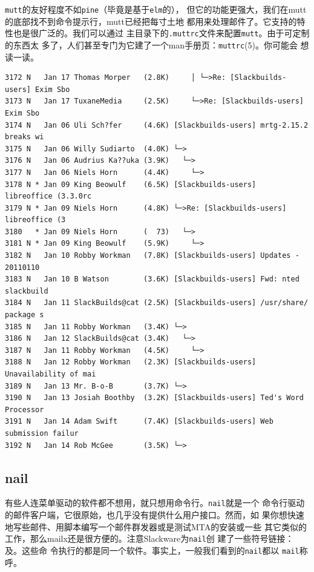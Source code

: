 \texttt{mutt}的友好程度不如\texttt{pine}（毕竟是基于\texttt{elm}的），
但它的功能更强大，我们在mutt的底部找不到命令提示行，mutt已经把每寸土地
都用来处理邮件了。它支持的特性也是很广泛的。我们可以通过
主目录下的\texttt{.muttrc}文件来配置\texttt{mutt}。由于可定制的东西太
多了，人们甚至专门为它建了一个man手册页：\texttt{muttrc}(5)。你可能会
想读一读。
\begin{Verbatim}[frame=single, commandchars=\\\{\}]
3172 N   Jan 17 Thomas Morper   (2.8K)     │ └─>Re: [Slackbuilds-users] Exim Sbo
3173 N   Jan 17 TuxaneMedia     (2.5K)     └─>Re: [Slackbuilds-users] Exim Sbo
3174 N   Jan 06 Uli Sch?fer     (4.6K) [Slackbuilds-users] mrtg-2.15.2 breaks wi
3175 N   Jan 06 Willy Sudiarto  (4.0K) └─>
3176 N   Jan 06 Audrius Ka??uka (3.9K)   └─>
3177 N   Jan 06 Niels Horn      (4.4K)     └─>
3178 N * Jan 09 King Beowulf    (6.5K) [Slackbuilds-users]  libreoffice (3.3.0rc
3179 N * Jan 09 Niels Horn      (4.8K) └─>Re: [Slackbuilds-users] libreoffice (3
3180   * Jan 09 Niels Horn      (  73)   └─>                                    
3181 N * Jan 09 King Beowulf    (5.9K)     └─>
3182 N   Jan 10 Robby Workman   (7.8K) [Slackbuilds-users] Updates - 20110110
3183 N   Jan 10 B Watson        (3.6K) [Slackbuilds-users] Fwd: nted slackbuild
3184 N   Jan 11 SlackBuilds@cat (2.5K) [Slackbuilds-users] /usr/share/ package s
3185 N   Jan 11 Robby Workman   (3.4K) └─>
3186 N   Jan 12 SlackBuilds@cat (3.4K)   └─>
3187 N   Jan 11 Robby Workman   (4.5K)     └─>
3188 N   Jan 12 Robby Workman   (2.3K) [Slackbuilds-users] Unavailability of mai
3189 N   Jan 13 Mr. B-o-B       (3.7K) └─>
3190 N   Jan 13 Josiah Boothby  (3.2K) [Slackbuilds-users] Ted's Word Processor
3191 N   Jan 14 Adam Swift      (7.4K) [Slackbuilds-users] Web submission failur
3192 N   Jan 14 Rob McGee       (3.5K) └─>
\end{Verbatim}

\subsection{nail}
\label{chap:basicNetworkCommands:email:nail}
有些人连菜单驱动的软件都不想用，就只想用命令行。\texttt{nail}就是一个
命令行驱动的邮件客户端，它很原始，也几乎没有提供什么用户接口。然而，如
果你想快速地写些邮件、用脚本编写一个邮件群发器或是测试MTA的安装或一些
其它类似的工作，那么mailx还是很方便的。注意Slackware为\texttt{nail}创
建了一些符号链接：及。这些命
令执行的都是同一个软件。事实上，一般我们看到的\texttt{nail}都以
\texttt{mail}称呼。

